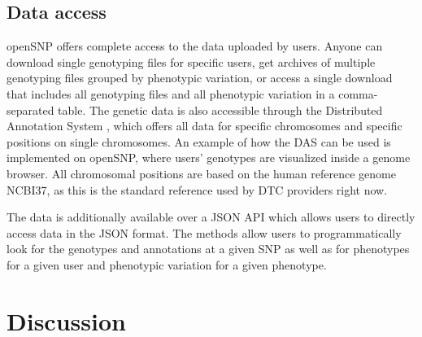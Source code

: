 \documentclass[10pt]{article}
\begin{document}
\subsection*{Data access}
openSNP offers complete access to the data uploaded by users. Anyone can download single genotyping files for specific users, get archives of multiple genotyping files 
grouped by phenotypic variation, or access a single download that includes all genotyping files and all phenotypic variation in a comma-separated table. The genetic data is also 
accessible through the Distributed Annotation System \cite{Dowell2001,Jenkinson2008}, which offers all data for specific chromosomes and specific positions on single chromosomes. 
An example of how the DAS can be used is implemented on openSNP, where users' genotypes are visualized inside a genome browser. All chromosomal positions are based on the human reference genome NCBI37, as this is the standard reference used by DTC providers right now.

The data is additionally available over a JSON API which allows users to directly access data in the JSON format. The methods allow users to programmatically look for the genotypes and annotations at a given SNP as well as for phenotypes for a given user and phenotypic variation for a given phenotype.



\section*{Discussion}

%
%
\end{document}
